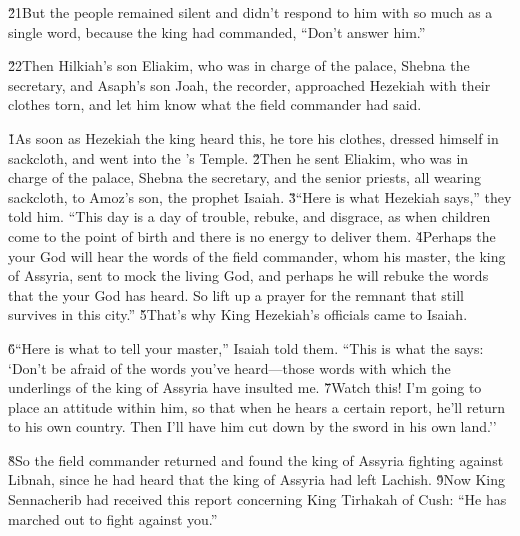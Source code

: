 \v{21}But the people remained silent and didn't respond to him with so much as a single word, because the king had commanded, ``Don't answer him.''

\v{22}Then Hilkiah's son Eliakim, who was in charge of the palace, Shebna the secretary, and Asaph's son Joah, the recorder, approached Hezekiah with their clothes torn, and let him know what the field commander had said.

\v{1}As soon as Hezekiah the king heard this, he tore his clothes, dressed himself in sackcloth, and went into the 's Temple. \v{2}Then he sent Eliakim, who was in charge of the palace, Shebna the secretary, and the senior priests, all wearing sackcloth, to Amoz's son, the prophet Isaiah. \v{3}``Here is what Hezekiah says,'' they told him. ``This day is a day of trouble, rebuke, and disgrace, as when children come to the point of birth and there is no energy to deliver them. \v{4}Perhaps the  your God will hear the words of the field commander, whom his master, the king of Assyria, sent to mock the living God, and perhaps he will rebuke the words that the  your God has heard. So lift up a prayer for the remnant that still survives in this city.'' \v{5}That's why King Hezekiah's officials came to Isaiah.

\v{6}``Here is what to tell your master,'' Isaiah told them. ``This is what the  says: `Don't be afraid of the words you've heard---those words with which the underlings of the king of Assyria have insulted me. \v{7}Watch this! I'm going to place an attitude within him, so that when he hears a certain report, he'll return to his own country. Then I'll have him cut down by the sword in his own land.''

\v{8}So the field commander returned and found the king of Assyria fighting against Libnah, since he had heard that the king of Assyria had left Lachish. \v{9}Now King Sennacherib had received this report concerning King Tirhakah of Cush: ``He has marched out to fight against you.''

